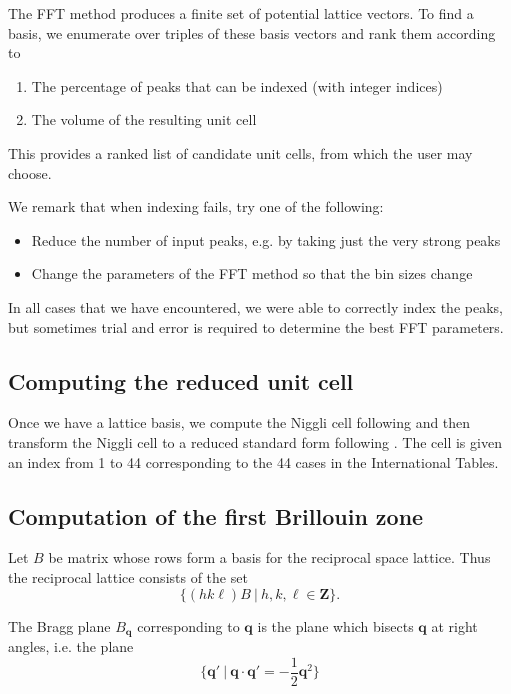 \documentclass[11pt,a4paper]{article}
\def\v#1{\bm{{#1}}}
\def\q{{\v{q}}}
\begin{document}
The FFT method produces a finite set of potential lattice vectors. To find a basis, we enumerate over
triples of these basis vectors and rank them according to
\begin{enumerate}
  \item The percentage of peaks that can be indexed (with integer indices)
  \item The volume of the resulting unit cell
\end{enumerate}

This provides a ranked list of candidate unit cells, from which the user may choose.

We remark that when indexing fails, try one of the following:
\begin{itemize}
  \item Reduce the number of input peaks, e.g. by taking just the very strong peaks
  \item Change the parameters of the FFT method so that the bin sizes change
\end{itemize}
In all cases that we have encountered, we were able to correctly index the peaks, but sometimes
trial and error is required to determine the best FFT parameters.


\subsection{Computing the reduced unit cell} \label{unit-cell}

Once we have a lattice basis, we compute the Niggli cell following \cite{Gru73, KrGr76}
and then transform the Niggli cell to a reduced standard form following \cite{GrSA03}. The cell
is given an index from 1 to 44 corresponding to the 44 cases in the International Tables.


\subsection{Computation of the first Brillouin zone}

Let $B$ be matrix whose rows form a basis for the reciprocal space lattice. Thus the reciprocal lattice consists
of the set
\begin{equation} \{ (h k \ell) B \ | \ h,k,\ell \in \mathbf{Z} \}. \end{equation}

The Bragg plane $B_\q$ corresponding to $\q$ is the plane which bisects $\q$ at right angles, i.e. the plane
\begin{equation} \{ \q' \ | \ \q \cdot \q' = -\frac{1}{2} \q^2\} \end{equation}
\end{document}
